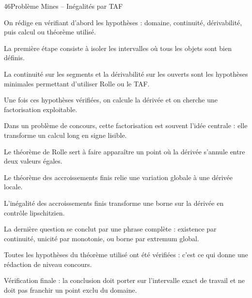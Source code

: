 \documentclass[11pt,a4paper]{article}
\begin{document}
\begin{corrbox}{46}{Problème Mines -- Inégalités par TAF}

\begin{methodebox}
On rédige en vérifiant d'abord les hypothèses : domaine, continuité, dérivabilité, puis calcul ou théorème utilisé.
\end{methodebox}

La première étape consiste à isoler les intervalles où tous les objets sont bien définis.


La continuité sur les segments et la dérivabilité sur les ouverts sont les hypothèses minimales permettant d'utiliser Rolle ou le TAF.


Une fois ces hypothèses vérifiées, on calcule la dérivée et on cherche une factorisation exploitable.


Dans un problème de concours, cette factorisation est souvent l'idée centrale : elle transforme un calcul long en signe lisible.


Le théorème de Rolle sert à faire apparaître un point où la dérivée s'annule entre deux valeurs égales.


Le théorème des accroissements finis relie une variation globale à une dérivée locale.


L'inégalité des accroissements finis transforme une borne sur la dérivée en contrôle lipschitzien.


La dernière question se conclut par une phrase complète : existence par continuité, unicité par monotonie, ou borne par extremum global.


Toutes les hypothèses du théorème utilisé ont été vérifiées : c'est ce qui donne une rédaction de niveau concours.


\begin{attentionbox}
Vérification finale : la conclusion doit porter sur l'intervalle exact de travail et ne doit pas franchir un point exclu du domaine.
\end{attentionbox}

\end{corrbox}
\end{document}
